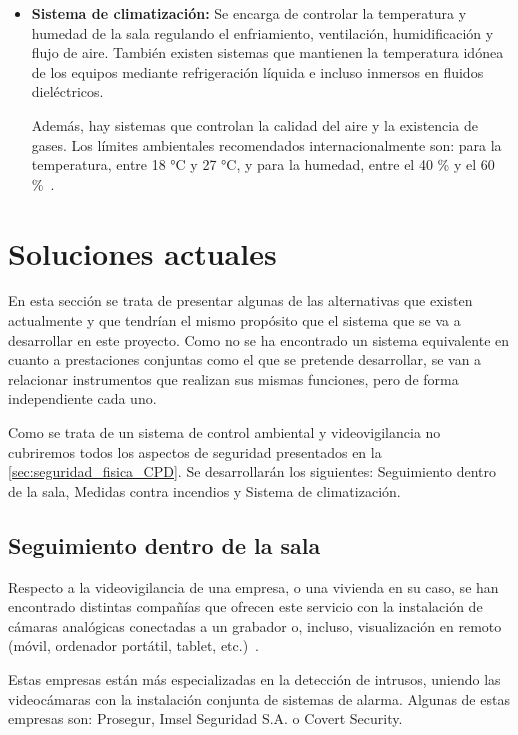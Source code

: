 \begin{itemize}
	\item \textbf{Sistema de climatización:} Se encarga de controlar la temperatura y humedad de la sala regulando el enfriamiento, ventilación, humidificación y flujo de aire. También existen sistemas que mantienen la temperatura idónea de los equipos mediante refrigeración líquida e incluso inmersos en fluidos dieléctricos.

	Además, hay sistemas que controlan la calidad del aire y la existencia de gases. Los límites ambientales recomendados internacionalmente son: para la temperatura, entre 18 °C y 27 °C, y para la humedad, entre el 40 \% y el 60 \%~\cite{serverscheck_recommended_nodate}.
\end{itemize}

\section{Soluciones actuales}\label{sec:soluciones-actuales}
En esta sección se trata de presentar algunas de las alternativas que existen actualmente y que tendrían el mismo propósito que el sistema que se va a desarrollar en este proyecto. Como no se ha encontrado un sistema equivalente en cuanto a prestaciones conjuntas como el que se pretende desarrollar, se van a relacionar instrumentos que realizan sus mismas funciones, pero de forma independiente cada uno.

Como se trata de un sistema de control ambiental y videovigilancia no cubriremos todos los aspectos de seguridad presentados en la \autoref{sec:seguridad_fisica_CPD}. Se desarrollarán los siguientes: Seguimiento dentro de la sala, Medidas contra incendios y Sistema de climatización.

\subsection{Seguimiento dentro de la sala}\label{subsec:seguimiento-dentro-de-la-sala}
Respecto a la videovigilancia de una empresa, o una vivienda en su caso, se han encontrado distintas compañías que ofrecen este servicio con la instalación de cámaras analógicas conectadas a un grabador o, incluso, visualización en remoto (móvil, ordenador portátil, tablet, etc.)~\cite{alarmadoo_videovigilancia_nodate}.

Estas empresas están más especializadas en la detección de intrusos, uniendo las videocámaras con la instalación conjunta de sistemas de alarma. Algunas de estas empresas son: Prosegur, Imsel Seguridad S.A. o Covert Security.

